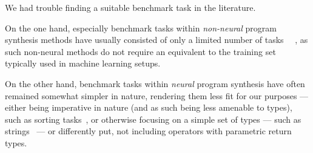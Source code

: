 \documentclass{article}
\begin{document}

We had trouble finding a suitable benchmark task in the literature.

On the one hand, especially benchmark tasks within \emph{non-neural} program synthesis methods have usually consisted of only a limited number of tasks%
~\citep{myth,lambda2,typedmil,houdini,tamandu,dilp}~\cite{terpret},
as such non-neural methods do not require an equivalent to the training set typically used in machine learning setups.

On the other hand, benchmark tasks within \emph{neural} program synthesis have often remained somewhat simpler in nature,
rendering them less fit for our purposes ---
either being imperative in nature (and as such being less amenable to types),
such as sorting tasks~\citep{npi,alphanpi},
or otherwise focusing on a simple set of types --- such as strings~\citep{nsps} ---%
or differently put, not including operators with parametric return types.
\end{document}
